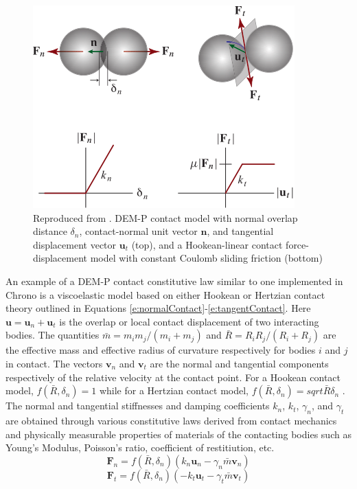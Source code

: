 \documentclass[12pt,onecolumn]{report}
\begin{document}
\begin{figure}
	\centering
	\includegraphics[width=\columnwidth]{Figs/DEM-PM_Contact_Model.png}
	\caption{\small Reproduced from \protect\cite{Chrono2016}. DEM-P contact model with normal overlap distance $\delta_n$, contact-normal unit vector $\boldsymbol{n}$, and tangential displacement vector $\boldsymbol{u}_t$ (top), and a Hookean-linear contact force-displacement model with constant Coulomb sliding friction (bottom) }  
	\label{fig:Penalty}
\end{figure}

An example of a DEM-P contact constitutive law similar to one implemented in Chrono is a viscoelastic model based on either Hookean or Hertzian contact theory outlined in Equations \ref{e:normalContact}-\ref{e:tangentContact}. Here $\boldsymbol{u} = \boldsymbol{u}_n + \boldsymbol{u}_t$ is the overlap or local contact displacement of two interacting bodies. The quantities $\bar{m} = m_i m_j/\left(m_i + m_j\right)$ and $\bar{R} = R_i R_j/\left(R_i + R_j\right)$ are the effective mass and effective radius of curvature respectively for bodies $i$ and $j$ in contact. The vectors $\boldsymbol{v}_n$ and $\boldsymbol{v}_t$ are the normal and tangential components respectively of the relative velocity at the contact point. For a Hookean contact model, $f\left(\bar{R},\delta_n\right) = 1$ while for a Hertzian contact model, $f\left(\bar{R},\delta_n\right) = sqrt{\bar{R}\delta_n}$ \cite{silbert2001granular,zhang2005jamming,MachadoMoreiraFloresLankarani2012}. The normal and tangential stiffnesses and damping coefficients $k_n$, $k_t$, $\gamma_n$, and $\gamma_t$ are obtained through various constitutive laws derived from contact mechanics and physically measurable properties of materials of the contacting bodies such as Young's Modulus, Poisson's ratio, coefficient of restitiution, etc. 
%
\begin{equation}\label{e:normalContact}
\boldsymbol{F}_n = f\left(\bar{R},\delta_n\right)\left(k_n \boldsymbol{u}_n - \gamma_n \bar{m}\boldsymbol{v}_n\right)
\end{equation}
%
\begin{equation}\label{e:tangentContact}
\boldsymbol{F}_t = f\left(\bar{R},\delta_n\right)\left(-k_t \boldsymbol{u}_t - \gamma_t \bar{m}\boldsymbol{v}_t\right)
\end{equation}
\end{document}
